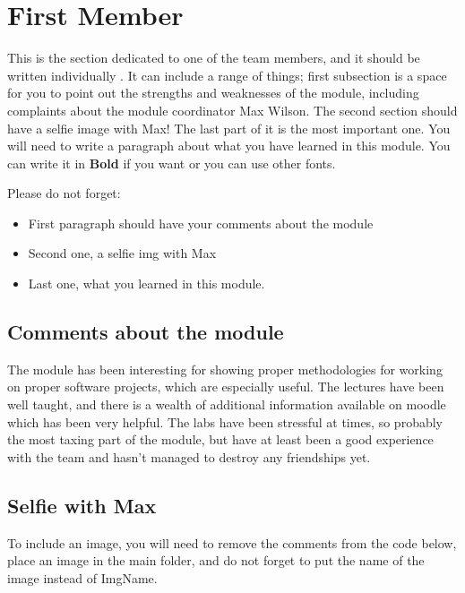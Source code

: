 \section{First Member}
This is the section dedicated to one of the team members, and it should be written individually . It can include a range of things; first subsection is a space for you to point out the strengths and weaknesses of the module, including complaints about the module coordinator Max Wilson. The second section should have a selfie image with Max! The last part of it is the most important one. You will need to write a paragraph about what you have learned in this module. You can write it in \textbf{Bold} if you want or you can use other fonts. 

Please do not forget:
\begin{itemize}
	\item First paragraph should have your comments about the module
	\item Second one, a selfie img with Max
	\item Last one, what you learned in this module.
\end{itemize}

\subsection{Comments about the module}
The module has been interesting for showing proper methodologies for working on proper software projects, which are especially useful. The lectures have been well taught, and there is a wealth of additional information available on moodle which has been very helpful. The labs have been stressful at times, so probably the most taxing part of the module, but have at least been a good experience with the team and hasn't managed to destroy any friendships yet.

\subsection{Selfie with Max}

To include an image, you will need to remove the comments from the code below, place an image in the main folder, and do not forget to put the name of the image instead of ImgName. 

